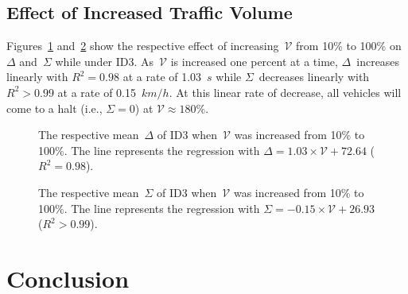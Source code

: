 \documentclass[preprint]{./acm_proc_article-sp}
\begin{document}
\subsection{Effect of Increased Traffic Volume}

Figures~\ref{fig:regress1} and~\ref{fig:regress2} show the respective effect of increasing~$\mathcal{V}$ from 10\% to 100\% on~$\Delta$ and~$\Sigma$ while under ID3. As~$\mathcal{V}$  is increased one percent at a time, $\Delta$~increases linearly with $R^2=0.98$ at a rate of 1.03~$s$ while $\Sigma$~decreases linearly with $R^2>0.99$ at a rate of 0.15~$km/h$. At this linear rate of decrease, all vehicles will come to a halt (i.e., $\Sigma=0$) at $\mathcal{V}\approx 180\%$.

\begin{figure}[bth]
\centering{}
\caption{The respective mean~$\Delta$ of ID3 when~$\mathcal{V}$ was increased from 10\% to 100\%. The line represents the regression with $\Delta = 1.03 \times \mathcal{V} + 72.64$ ($R^2=0.98$).}\label{fig:regress1}
\end{figure}

\begin{figure}[bth]
\centering{}
\caption{The respective mean~$\Sigma$ of ID3 when~$\mathcal{V}$ was increased from 10\% to 100\%. The line represents the regression with $\Sigma = -0.15 \times \mathcal{V} + 26.93$ ($R^2>0.99$).}\label{fig:regress2}
\end{figure}

\section{Conclusion}\label{sec:conclude}
\end{document}
